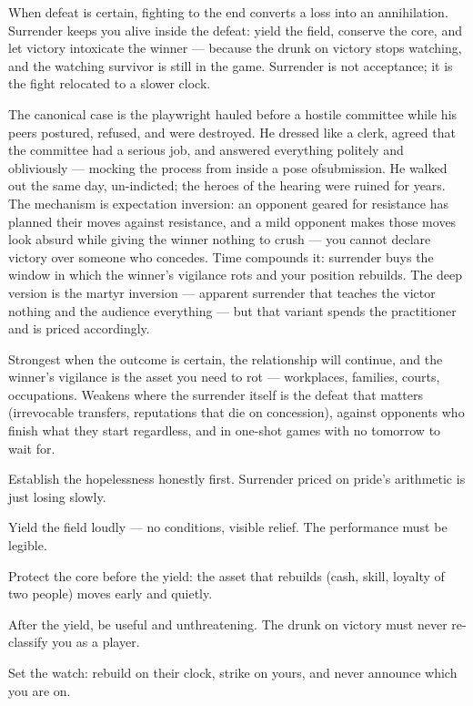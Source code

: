 \begin{core}
When defeat is certain, fighting to the end converts a loss into an annihilation. Surrender keeps you alive inside the defeat: yield the field, conserve the core, and let victory intoxicate the winner --- because the drunk on victory stops watching, and the watching survivor is still in the game. Surrender is not acceptance; it is the fight relocated to a slower clock.
\end{core}
\begin{mechanism}
The canonical case is the playwright hauled before a hostile committee while his peers postured, refused, and were destroyed. He dressed like a clerk, agreed that the committee had a serious job, and answered everything politely and obliviously --- mocking the process from inside a pose ofsubmission. He walked out the same day, un-indicted; the heroes of the hearing were ruined for years. The mechanism is expectation inversion: an opponent geared for resistance has planned their moves against resistance, and a mild opponent makes those moves look absurd while giving the winner nothing to crush --- you cannot declare victory over someone who concedes. Time compounds it: surrender buys the window in which the winner's vigilance rots and your position rebuilds. The deep version is the martyr inversion --- apparent surrender that teaches the victor nothing and the audience everything --- but that variant spends the practitioner and is priced accordingly.
\end{mechanism}
\begin{conditions}
Strongest when the outcome is certain, the relationship will continue, and the winner's vigilance is the asset you need to rot --- workplaces, families, courts, occupations. Weakens where the surrender itself is the defeat that matters (irrevocable transfers, reputations that die on concession), against opponents who finish what they start regardless, and in one-shot games with no tomorrow to wait for.
\end{conditions}
\begin{application}
  \item Establish the hopelessness honestly first. Surrender priced on pride's arithmetic is just losing slowly.
  \item Yield the field loudly --- no conditions, visible relief. The performance must be legible.
  \item Protect the core before the yield: the asset that rebuilds (cash, skill, loyalty of two people) moves early and quietly.
  \item After the yield, be useful and unthreatening. The drunk on victory must never re-classify you as a player.
  \item Set the watch: rebuild on their clock, strike on yours, and never announce which you are on.
\end{application}
